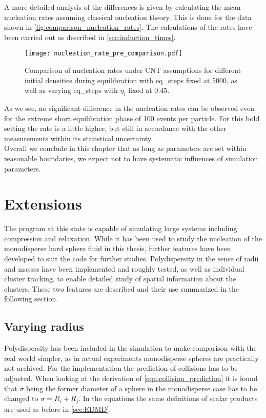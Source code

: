 A more detailed analysis of the differences is given by calculating the mean nucleation rates assuming classical nucleation theory. This is done for the data shown in \autoref{fig:comparison_nucleation_rates}. The calculations of the rates have been carried out as described in \autoref{sec:induction_times}.

\begin{figure}[h!]
\centering
\texttt{[image: nucleation\_rate\_pre\_comparison.pdf]}
\caption[Nucleation rate comparison of test measurements]{Comparison of nucleation rates under CNT assumptions for different initial densities during equilibration with eq\_steps fixed at 5000, as well as varying eq\_steps with $\eta_i$ fixed at 0.45. }
\label{fig:comparison_nucleation_rates}
\end{figure}

As we see, no significant difference in the nucleation rates can be observed even for the extreme short equilibration phase of 100 events per particle. For this bold setting the rate is a little higher, but still in accordance with the other measurements within its statistical uncertainty.\\

Overall we conclude in this chapter that as long as parameters are set within reasonable boundaries, we expect not to have systematic influences of simulation parameters. 

\section{Extensions}
\label{sec:simulation_ext}
The program at this state is capable of simulating large systems including compression and relaxation. While it has been used to study the nucleation of the monodisperse hard sphere fluid in this thesis, further features have been developed to suit the code for further studies. Polydispersity in the sense of radii and masses have been implemented and roughly tested, as well as individual cluster tracking, to enable detailed study of spatial information about the clusters. These two features are described and their use summarized in the following section.

\subsection{Varying radius}
\label{sec:extension_radius}
Polydispersity has been included in the simulation to make comparison with the real world simpler, as in actual experiments monodisperse spheres are practically not archived. For the implementation the prediction of collisions has to be adjusted. When looking at the derivation of \autoref{eqn:collision_prediction} it is found that $\sigma$ being the former diameter of a sphere in the monodisperse case has to be changed to $\sigma=R_i+R_j$. In the equations the same definitions of scalar products are used as before in \autoref{sec:EDMD}.


